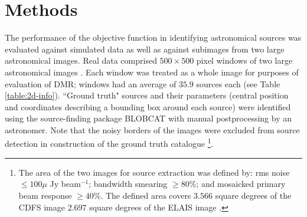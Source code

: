 \documentclass[
    ,final            %
  ]
  {aipproc}
\begin{document}
\section{Methods}
The performance of the objective function in identifying astronomical sources was evaluated against simulated data as well as against subimages from two large astronomical images. 
Real data comprised $500 \times 500$ pixel windows of two large astronomical images \cite{norris2006deep}. Each window was treated as a whole image for purposes of evaluation of DMR; windows had an average of $35.9$ sources each (see Table \ref{table:2d-info}). 
``Ground truth" sources and their parameters (central position and coordinates describing a bounding box around each source) were identified using the source-finding package BLOBCAT \cite{hales2012blobcat} with manual postprocessing by an astronomer. Note that the noisy borders of the images were excluded from source detection in construction of the ground truth catalogue \footnote{The area of the two images for source extraction was defined by: rms noise $\le 100 \mu$ Jy beam$^{−1}$; bandwidth smearing $ \ge 80\%$; and mosaicked primary beam response $\ge 40\%$. The defined area covers $3.566$ square degrees of the CDFS image $2.697$ square degrees of the ELAIS image \cite{banfield2013australia}.}.
\end{document}
